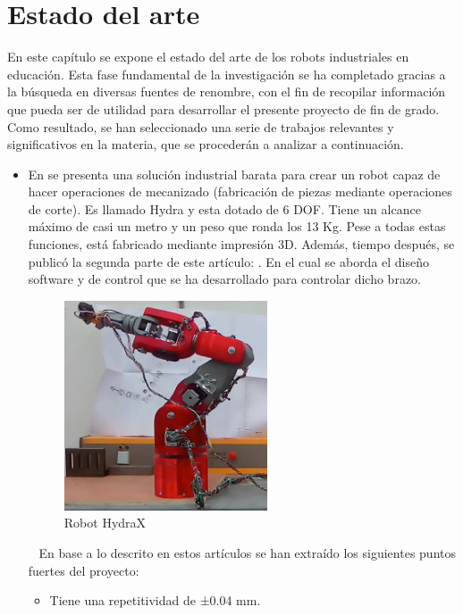 \chapter{Estado del arte}
\label{cap:capitulo2}
En este capítulo se expone el estado del arte de los robots industriales en educación. Esta fase fundamental de la 
investigación se ha completado gracias a la búsqueda en diversas fuentes de renombre, con el fin de 
recopilar información que pueda ser de utilidad para desarrollar el presente proyecto de fin de grado. Como resultado, se 
han seleccionado una serie de trabajos relevantes y significativos en la materia, que se procederán a analizar a continuación.
\begin{itemize}
    \item En \cite{KRIMPENIS2020103} se presenta una solución industrial barata para crear un robot capaz de hacer operaciones de mecanizado (fabricación 
    de piezas mediante operaciones de corte). Es llamado Hydra y esta dotado de 6 \ac{DOF}. Tiene un alcance máximo de casi un metro y un 
    peso que ronda los 13 Kg. Pese a todas estas funciones, está fabricado mediante impresión 3D. 
    Además, tiempo después, se publicó la segunda parte de este artículo: \cite{PAPAPASCHOS2020109}. En el cual se aborda el diseño software y de control 
    que se ha desarrollado para controlar dicho brazo. \\
    \begin{figure} [h!]
        \begin{center}
          \includegraphics[width=6cm]{figs/Hydra.png}
        \end{center}
        \caption{Robot HydraX}
        \label{fig:hydra}
    \end{figure}\ 
    \newpage
    En base a lo descrito en estos artículos se han extraído los siguientes puntos fuertes del proyecto:
    \begin{itemize}
        \item Tiene una repetitividad de ±0.04 mm.

\end{itemize}
\end{itemize}
